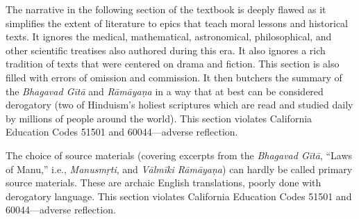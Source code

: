 The narrative in the following section of the textbook is deeply flawed as it simplifies the extent of literature to epics that teach moral lessons and historical texts. It ignores the medical, mathematical, astronomical, philosophical, and other scientific treatises also authored during this era. It also ignores a rich tradition of texts that were centered on drama and fiction. This section is also filled with errors of omission and commission. It then butchers the summary of the \textit{Bhagavad Gītā} and \textit{Rāmāyaṇa} in a way that at best can be considered derogatory (two of Hinduism’s holiest scriptures which are read and studied daily by millions of people around the world). This section violates California Education Codes 51501 and 60044—adverse reflection.

The choice of source materials (covering excerpts from the \textit{Bhagavad Gītā}, “Laws of Manu,” i.e., \textit{Manusmṛti}, and \textit{Vālmīki Rāmāyaṇa}) can hardly be called primary source materials. These are archaic English translations, poorly done with derogatory language. This section violates California Education Codes 51501 and 60044—adverse reflection.

